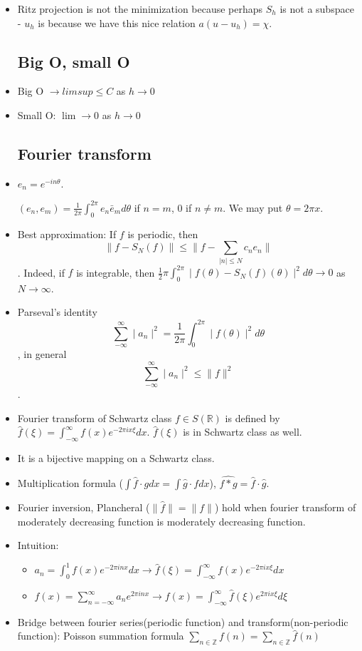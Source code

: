 \documentclass{article}
\theoremstyle{remark}
\begin{document}
\newpage
\begin{itemize}
\subsection*{Projection}
\item Ritz projection is not the minimization because perhaps $S_h$ is not a subspace - $u_h$ is because we have this nice relation $a(u-u_h)=\chi$.





\subsection*{Big O, small O}
    \item Big O $\to limsup\leq C$ as $h\to 0$
    \item Small O: $\lim\to 0$ as $h\to 0$
\subsection*{Fourier transform}
    \item $e_n=e^{-in\theta}$. 

    $(e_n, e_m)=\frac 1{2\pi}\int^{2\pi}_0 e_n\bar e_md\theta$ if $n=m$, 0 if $n\neq m$. We may put $\theta=2\pi x$.
    \item Best approximation: If $f$ is periodic, then $$\lVert f-S_N (f)\rVert\leq \lVert f-\sum_{\mid n\mid\leq N}c_ne_n\lVert$$. Indeed, if $f$ is integrable, then $\frac 1 2\pi\int^{2\pi}_0\mid f(\theta)-S_N (f)(\theta)\mid^2d\theta\to 0$ as $N\to \infty$.
    \item Parseval's identity
    $$\sum^\infty_{-\infty}\mid a_n\mid^2=\frac 1 {2\pi}\int^{2\pi}_0 \mid f(\theta)\mid^2 d\theta$$, in general $$\sum^\infty_{-\infty}\mid a_n\mid^2\leq \lVert f\rVert ^2$$.
    \item Fourier transform of Schwartz class $f\in S(\mathbb{R})$ is defined by $\hat f(\xi)=\int^\infty_{-\infty}f(x)e^{-2\pi ix\xi}dx$. $\hat f(\xi)$ is in Schwartz class as well.
    \item It is a bijective mapping on a Schwartz class. 
    \item Multiplication formula ($\int \hat f \cdot gdx=\int \hat g\cdot fdx$), $\hat{f*g}=\hat f\cdot\hat g$.
    \item Fourier inversion, Plancheral ($\lVert \hat f\rVert=\lVert f\rVert$) hold when fourier transform of moderately decreasing function is moderately decreasing function. 
    \item Intuition:
    \begin{itemize}
        \item $a_n=\int^1_0 f(x)e^{-2\pi inx}dx\to \hat f(\xi)=\int^\infty_{-\infty} f(x)e^{-2\pi ix\xi}dx$
        \item $f(x)=\sum^\infty_{n=-\infty}a_n e^{2\pi inx}\to f(x)=\int ^\infty_{-\infty}\hat f(\xi)e^{2\pi ix\xi}d\xi$
    \end{itemize}
    \item Bridge between fourier series(periodic function) and transform(non-periodic function): Poisson summation formula $\sum_{n\in\mathbb{Z}}f(n)=\sum_{n\in\mathbb{Z}}\hat f(n)$
    \end{itemize}
\end{document}
